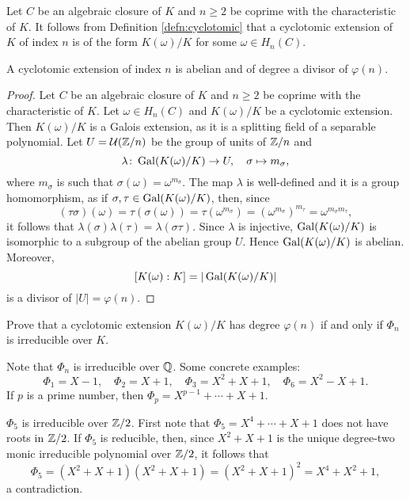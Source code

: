 Let $C$ be an algebraic closure of $K$ and $n\geq2$ be coprime with the characteristic of $K$. 
It follows from Definition \ref{defn:cyclotomic} 
that a cyclotomic extension of $K$ of index $n$ is of the form 
$K(\omega)/K$ for some $\omega\in H_n(C)$. 

\begin{proposition}
    A cyclotomic extension of index $n$ is abelian and of degree a divisor of $\varphi(n)$. 
\end{proposition}

\begin{proof}
    Let $C$ be an algebraic closure of $K$ and $n\geq2$ be coprime with the characteristic of $K$. 
    Let $\omega\in H_n(C)$ and $K(\omega)/K$ be a cyclotomic extension. Then $K(\omega)/K$
    is a Galois extension, as it is a splitting field of a separable polynomial. 
    Let $U=\mathcal{U}(\mathbb{Z}/n)$ be the group of units of $\mathbb{Z}/n$ and 
    \[
    \lambda\colon \operatorname{Gal}(K(\omega)/K)\to U,
    \quad
    \sigma\mapsto m_{\sigma},
    \]
    where $m_{\sigma}$ is such that $\sigma(\omega)=\omega^{m_{\sigma}}$. The map $\lambda$ is well-defined and
    it is a group homomorphism, as if $\sigma,\tau\in\operatorname{Gal}(K(\omega)/K)$, then, since 
    \[
        (\tau\sigma)(\omega)=\tau(\sigma(\omega))=\tau(\omega^{m_\sigma})=\left(\omega^{m_\sigma}\right)^{m_\tau}=\omega^{m_\sigma m_\tau},
    \]
    it follows that $\lambda(\sigma)\lambda(\tau)=\lambda(\sigma\tau)$. Since 
    $\lambda$ is injective, $\operatorname{Gal}(K(\omega)/K)$ is isomorphic to a subgroup 
    of the abelian group $U$. Hence $\operatorname{Gal}(K(\omega)/K)$ is abelian. Moreover, 
    \[
    [K(\omega):K]=|\operatorname{Gal}(K(\omega)/K)|
    \]
    is a divisor of $|U|=\varphi(n)$. 
\end{proof}

\begin{exercise}
    Prove that a cyclotomic extension $K(\omega)/K$ has degree $\varphi(n)$ if and only if 
    $\Phi_n$ is irreducible over $K$. 
\end{exercise}

Note that $\Phi_n$ is irreducible over $\mathbb{Q}$. Some concrete examples:
\[
\Phi_1=X-1,
\quad
\Phi_2=X+1,
\quad
\Phi_3=X^2+X+1,
\quad
\Phi_6=X^2-X+1.
\]
If $p$ is a prime number, then $\Phi_p=X^{p-1}+\cdots+X+1$. 

\begin{example}
    $\Phi_5$ is irreducible over $\mathbb{Z}/2$. First note that
    $\Phi_5=X^{4}+\cdots+X+1$ does not have roots in $\mathbb{Z}/2$. If 
    $\Phi_5$ is reducible, then, since
    $X^2+X+1$ is the unique degree-two 
    monic irreducible polynomial 
    over $\mathbb{Z}/2$, it follows that
    \[
    \Phi_5=(X^2+X+1)(X^2+X+1)=(X^2+X+1)^2=X^4+X^2+1,
    \]
    a contradiction.
\end{example}

